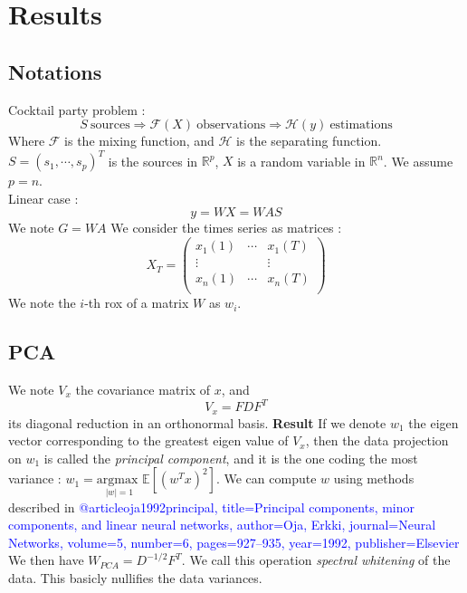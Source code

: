 \documentclass[a4paper,11pt,titlepage]{article}
\begin{document}
\section{Results}
\subsection{Notations}
Cocktail party problem :
\begin{equation*}
	S \ \text{sources} \Rightarrow \mathcal{F}(X) \ \text{observations} \Rightarrow \mathcal{H}(y) \ \text{estimations}
\end{equation*}
Where $\mathcal{F}$ is the mixing function, and $\mathcal{H}$ is the separating function. $S = (s_1,\cdots,s_p)^T$ is the sources in $\mathds{R}^p$, $X$ is a random variable in $\mathds{R}^n$. We assume $p=n$.
\\
Linear case :
\begin{equation*}
	y = WX = WAS
\end{equation*}
We note $G = WA$
We consider the times series as matrices :
\begin{equation*}
X_T=\begin{pmatrix}
x_1(1)& \cdots & x_1(T) \\
\vdots & & \vdots \\
x_n(1)& \cdots & x_n(T) \\
\end{pmatrix}
\end{equation*}
We note the $i$-th rox of a matrix $W$ as $w_i$.

\subsection{PCA}
We note $V_x$ the covariance matrix of $x$, and
\begin{equation*}
	V_x = FDF^T
\end{equation*}
its diagonal reduction in an orthonormal basis.
\textbf{Result} If we denote $w_1$ the eigen vector corresponding to the greatest eigen value of $V_x$, then the data projection on $w_1$ is called the \textit{principal component}, and it is the one coding the most variance : $w_1 = \underset{|w|=1}{\text{argmax }}\mathds{E}[(w^Tx)^2]$.
We can compute $w$ using methods described in \textcolor{blue}{@article{oja1992principal,
title={Principal components, minor components, and linear neural networks},
author={Oja, Erkki},
journal={Neural Networks},
volume={5},
number={6},
pages={927--935},
year={1992},
publisher={Elsevier}
}
}
\\
We then have $W_{PCA}=D^{-1/2}F^T$. We call this operation \textit{spectral whitening} of the data. This basicly nullifies the data variances.
\end{document}
